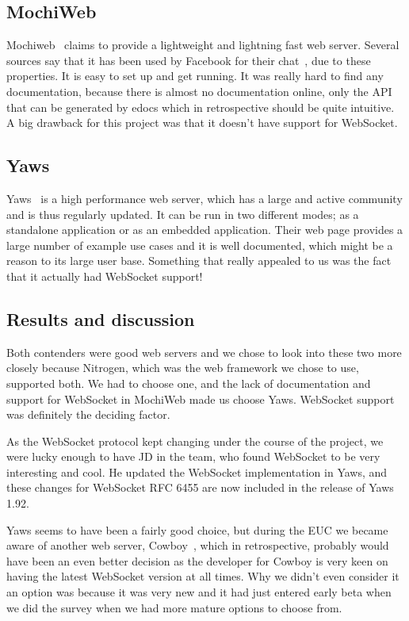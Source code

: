 \documentclass[11pt,a4paper]{report}
\begin{document}
\subsection{MochiWeb}
Mochiweb~\cite{mochiweb} claims to provide a lightweight and lightning fast
web server. Several sources say that it has been used by Facebook for their
chat~\cite{fb_chat, fb_pres}, due to these properties. It is easy to set up
and get running. It was really hard to find any documentation, because there is
almost no documentation online, only the API that can be generated by edocs
which in retrospective should be quite intuitive. A big drawback for this
project was that it doesn't have support for WebSocket.

\subsection{Yaws}
Yaws~\cite{yaws} is a high performance web server, which has a large and active
community and is thus regularly updated. It can be run in two different modes;
as a standalone application or as an embedded application. Their web page
provides a large number of example use cases and it is well documented, which
might be a reason to its large user base. Something that really appealed to us
was the fact that it actually had WebSocket support!

\subsection{Results and discussion}
Both contenders were good web servers and we chose to look into these two more
closely because Nitrogen, which was the web framework we chose to use,
supported both. We had to choose one, and the lack of documentation and support
for WebSocket in MochiWeb made us choose Yaws. WebSocket support was definitely
the deciding factor.

As the WebSocket protocol kept changing under the course of the project, we were
lucky enough to have JD in the team, who found WebSocket to be very interesting
and cool. He updated the WebSocket implementation in Yaws, and these changes for
WebSocket RFC 6455 are now included in the release of Yaws 1.92.

Yaws seems to have been a fairly good choice, but during the EUC we became aware
of another web server, Cowboy~\cite{cowboy_pres}, which in retrospective,
probably would have been an even better decision as the developer for Cowboy is
very keen on having the latest WebSocket version at all times. Why we didn't
even consider it an option was because it was very new and it had just entered
early beta when we did the survey when we had more mature options to choose
from.
\end{document}
